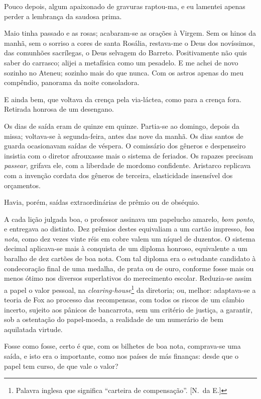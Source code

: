 Pouco depois, algum apaixonado de gravuras raptou{}-ma, e eu lamentei
apenas perder a lembrança da saudosa prima. 

Maio tinha passado e as
rosas; acabaram{}-se as orações à Virgem. Sem os hinos da manhã, sem o
sorriso a cores de santa Rosália, restava{}-me o Deus dos novíssimos,
das comunhões sacrílegas, o Deus selvagem do Barreto. Positivamente não
quis saber do carrasco; alijei a metafísica como um pesadelo. E me
achei de novo sozinho no Ateneu; sozinho mais do que nunca. Com os
astros apenas do meu compêndio, panorama da noite consoladora. 

E ainda bem, que voltava da crença pela via{}-láctea, como para a crença fora.
Retirada honrosa de um desengano. 

Os dias de saída eram de quinze em
quinze. Partia{}-se ao domingo, depois da missa; voltava{}-se à
segunda{}-feira, antes das nove da manhã. Os dias santos de guarda
ocasionavam saídas de véspera. O comissário dos gêneros e despenseiro
insistia com o diretor afrouxasse mais o sistema de feriados. Os
rapazes precisam \textit{passear}, grifava ele, com a liberdade de mordomo
confidente. Aristarco replicava com a invenção cordata dos gêneros de
terceira, elasticidade insensível dos orçamentos. 

Havia, porém, saídas extraordinárias de prêmio ou de obséquio.

A cada lição julgada boa, o
professor assinava um papelucho amarelo, \textit{bom ponto}, e entregava ao
distinto. Dez prêmios destes equivaliam a um cartão impresso, \textit{boa nota},
como dez vezes vinte réis em cobre valem um níquel de duzentos. O
sistema decimal aplicava{}-se mais à conquista de um diploma honroso,
equivalente a um baralho de dez cartões de boa nota. Com tal diploma
era o estudante candidato à condecoração final de uma medalha, de prata
ou de ouro, conforme fosse mais ou menos ótimo nos diversos
superlativos do merecimento escolar. Reduzia{}-se assim a papel o valor
pessoal, na \textit{clearing{}-house}\footnote{ Palavra inglesa que significa 
``carteira de compensação''. [N.~da E.]} da diretoria; ou, melhor: adaptava{}-se a
teoria de Fox ao processo das recompensas, com todos os riscos de um
câmbio incerto, sujeito aos pânicos de bancarrota, sem um critério de
justiça, a garantir, sob a ostentação do papel{}-moeda, a realidade de
um numerário de bem aquilatada virtude. 

Fosse como fosse, certo é que,
com os bilhetes de boa nota, comprava{}-se uma saída, e isto era o
importante, como nos países de más finanças: desde que o papel tem
curso, de que vale o valor? 

